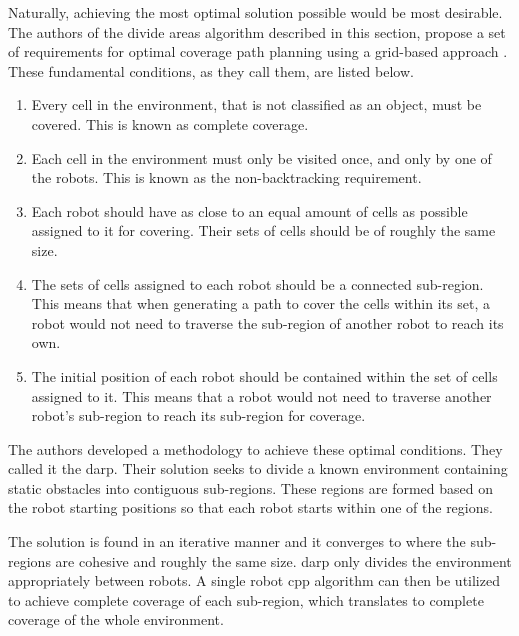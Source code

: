 Naturally, achieving the most optimal solution possible would be most desirable. The authors of the divide areas algorithm described in this section, propose a set of requirements for optimal coverage path planning using a grid-based approach \cite{DARP2017}. These fundamental conditions, as they call them, are listed below.
\begin{enumerate}
\item Every cell in the environment, that is not classified as an object, must be covered. This is known as complete coverage.
\item Each cell in the environment must only be visited once, and only by one of the robots. This is known as the non-backtracking requirement.
\item Each robot should have as close to an equal amount of cells as possible assigned to it for covering. Their sets of cells should be of roughly the same size.
\item The sets of cells assigned to each robot should be a connected sub-region. This means that when generating a path to cover the cells within its set, a robot would not need to traverse the sub-region of another robot to reach its own.
\item The initial position of each robot should be contained within the set of cells assigned to it. This means that a robot would not need to traverse another robot's sub-region to reach its sub-region for coverage.
\end{enumerate}
The authors developed a methodology to achieve these optimal conditions. They called it the \ac{darp}. Their solution seeks to divide a known environment containing static obstacles into contiguous sub-regions. These regions are formed based on the robot starting positions so that each robot starts within one of the regions.

The solution is found in an iterative manner and it converges to where the sub-regions are cohesive and roughly the same size. \ac{darp} only divides the environment appropriately between robots. A single robot \ac{cpp} algorithm can then be utilized to achieve complete coverage of each sub-region, which translates to complete coverage of the whole environment.
